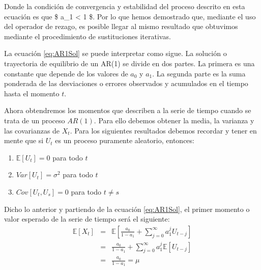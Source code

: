 \documentclass[
]{book}
\begin{document}
Donde la condición de convergencia y estabilidad del proceso descrito en esta ecuación es que \$ \textbar a\_1\textbar{} \textless{} 1 \$. Por lo que hemos demostrado que, mediante el uso del operador de rezago, es posible llegar al mismo resultado que obtuvimos mediante el procedimiento de sustituciones iterativas.

La ecuación \eqref{eq:AR1Sol} se puede interpretar como sigue. La solución o trayectoria de equilibrio de un AR(1) se divide en dos partes. La primera es una constante que depende de los valores de \(a_0\) y \(a_1\). La segunda parte es la suma ponderada de las desviaciones o errores observados y acumulados en el tiempo hasta el momento \(t\).

Ahora obtendremos los momentos que describen a la serie de tiempo cuando se trata de un proceso \(AR(1)\). Para ello debemos obtener la media, la varianza y las covarianzas de \(X_t\). Para los siguientes resultados debemos recordar y tener en mente que si \(U_t\) es un proceso puramente aleatorio, entonces:

\begin{enumerate}
\def\labelenumi{\arabic{enumi}.}
\item
  \(\mathbb{E}[U_t] = 0\) para todo \(t\)
\item
  \(Var[U_t] = \sigma^2\) para todo \(t\)
\item
  \(Cov[U_t, U_s] = 0\) para todo \(t \neq s\)
\end{enumerate}

Dicho lo anterior y partiendo de la ecuación \eqref{eq:AR1Sol}, el primer momento o valor esperado de la serie de tiempo será el siguiente:
\begin{eqnarray}
    \mathbb{E}[X_t] & = & \mathbb{E} \left[ \frac{a_0}{1 - a_1} + \sum^{\infty}_{j = 0} a_1^j U_{t-j} \right] \nonumber \\
    & = & \frac{a_0}{1 - a_1} + \sum^{\infty}_{j = 0} a_1^j \mathbb{E}[U_{t-j}] \nonumber \\
    & = & \frac{a_0}{1 - a_1} = \mu
    \label{eq:AR1m1}
\end{eqnarray}
\end{document}
